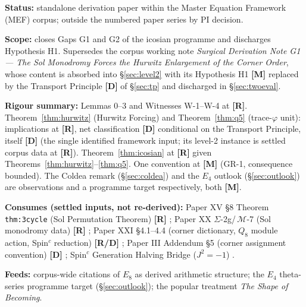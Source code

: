 \documentclass[11pt,a4paper]{article}
\theoremstyle{plain}
\theoremstyle{definition}
\theoremstyle{remark}
\newcommand{\rtag}[1]{\textnormal{\textbf{[#1]}}}
\begin{document}
\begin{statusbox}
\textbf{Status:} standalone derivation paper within the Master Equation Framework (MEF) corpus; outside the numbered paper series by PI decision.

\smallskip
\textbf{Scope:} closes Gaps G1 and G2 of the icosian programme and discharges Hypothesis H1. Supersedes the corpus working note \emph{Surgical Derivation Note G1 --- The Sol Monodromy Forces the Hurwitz Enlargement of the Corner Order}, whose content is absorbed into \S\ref{sec:level2} with its Hypothesis H1 \rtag{M} replaced by the Transport Principle \rtag{D} of \S\ref{sec:tp} and discharged in \S\ref{sec:twoeval}.

\smallskip
\textbf{Rigour summary:} Lemmas 0--3 and Witnesses W-1--W-4 at \rtag{R}. Theorem~\ref{thm:hurwitz} (Hurwitz Forcing) and Theorem~\ref{thm:q5} (trace-$\varphi$ unit): implications at \rtag{R}, net classification \rtag{D} conditional on the Transport Principle, itself \rtag{D} (the single identified framework input; its level-2 instance is settled corpus data at \rtag{R}). Theorem~\ref{thm:icosian} at \rtag{R} given Theorems~\ref{thm:hurwitz}--\ref{thm:q5}. One convention at \rtag{M} (GR-1, consequence bounded). The Coldea remark (\S\ref{sec:coldea}) and the $E_4$ outlook (\S\ref{sec:outlook}) are observations and a programme target respectively, both \rtag{M}.

\smallskip
\textbf{Consumes (settled inputs, not re-derived):} Paper XV \S8 Theorem \texttt{thm:3cycle} (Sol Permutation Theorem) \rtag{R} \cite{PaperXV}; Paper XX $\Sigma$-2g/\,$\mathcal{M}$-7 (Sol monodromy data) \rtag{R} \cite{PaperXX}; Paper XXI \S4.1--4.4 (corner dictionary, $Q_8$ module action, Spin$^c$ reduction) \rtag{R/D} \cite{PaperXXI}; Paper III Addendum \S5 (corner assignment convention) \rtag{D} \cite{PaperIIIAdd}; Spin$^c$ Generation Halving Bridge ($J^2 = -1$) \cite{SpincBridge}.

\smallskip
\textbf{Feeds:} corpus-wide citations of $E_8$ as derived arithmetic structure; the $E_4$ theta-series programme target (\S\ref{sec:outlook}); the popular treatment \emph{The Shape of Becoming}.
\end{statusbox}
\end{document}
